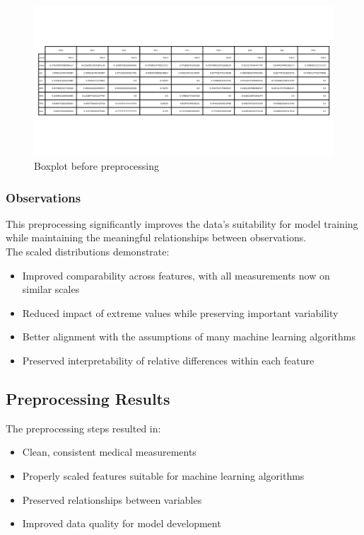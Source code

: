 \documentclass[a4paper,12pt]{article}
\begin{document}
\begin{figure}[ht]
    \centering
    \includegraphics[width=1\textwidth]{images/df_scaled_describe_table.png}
    \caption{Boxplot before preprocessing}
\end{figure}

\subsubsection*{Observations}
This preprocessing significantly improves the data's suitability for model training while maintaining the meaningful relationships between observations.\\
The scaled distributions demonstrate:
\begin{itemize}
    \item Improved comparability across features, with all measurements now on similar scales
    \item Reduced impact of extreme values while preserving important variability
    \item Better alignment with the assumptions of many machine learning algorithms
    \item Preserved interpretability of relative differences within each feature
\end{itemize}

\subsection{Preprocessing Results}
The preprocessing steps resulted in:
\begin{itemize}
    \item Clean, consistent medical measurements
    \item Properly scaled features suitable for machine learning algorithms
    \item Preserved relationships between variables
    \item Improved data quality for model development
\end{itemize}
\end{document}
